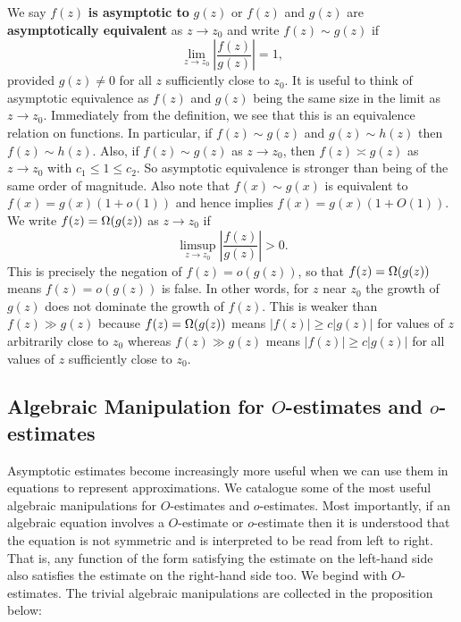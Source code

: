        We say $f(z)$ \textbf{is asymptotic to} $g(z)$ or $f(z)$ and $g(z)$ are \textbf{asymptotically equivalent} as $z \to z_{0}$ and write $f(z) \sim g(z)$ if
        \[
          \lim_{z \to z_{0}}\left|\frac{f(z)}{g(z)}\right| = 1,
        \]
        provided $g(z) \neq 0$ for all $z$ sufficiently close to $z_{0}$. It is useful to think of asymptotic equivalence as $f(z)$ and $g(z)$ being the same size in the limit as $z \to z_{0}$. Immediately from the definition, we see that this is an equivalence relation on functions. In particular, if $f(z) \sim g(z)$ and $g(z) \sim h(z)$ then $f(z) \sim h(z)$. Also, if $f(z) \sim g(z)$ as $z \to z_{0}$, then $f(z) \asymp g(z)$ as $z \to z_{0}$ with $c_{1} \le 1 \le c_{2}$. So asymptotic equivalence is stronger than being of the same order of magnitude. Also note that $f(x) \sim g(x)$ is equivalent to $f(x) = g(x)(1+o(1))$ and hence implies $f(x) = g(x)(1+O(1))$. We write $f(z) = \Omega(g(z))$ as $z \to z_{0}$ if
        \[
          \limsup_{z \to z_{0}}\left|\frac{f(z)}{g(z)}\right| > 0.
        \]
        This is precisely the negation of $f(z) = o(g(z))$, so that $f(z) = \Omega(g(z))$ means $f(z) = o(g(z))$ is false. In other words, for $z$ near $z_{0}$ the growth of $g(z)$ does not dominate the growth of $f(z)$. This is weaker than $f(z) \gg g(z)$ because $f(z) = \Omega(g(z))$ means $|f(z)| \ge c|g(z)|$ for values of $z$ arbitrarily close to $z_{0}$ whereas $f(z) \gg g(z)$ means $|f(z)| \ge c|g(z)|$ for all values of $z$ sufficiently close to $z_{0}$.
      \subsection*{Algebraic Manipulation for \texorpdfstring{$O$}{O}-estimates and \texorpdfstring{$o$}{o}-estimates}
        Asymptotic estimates become increasingly more useful when we can use them in equations to represent approximations. We catalogue some of the most useful algebraic manipulations for $O$-estimates and $o$-estimates. Most importantly, if an algebraic equation involves a $O$-estimate or $o$-estimate then it is understood that the equation is not symmetric and is interpreted to be read from left to right. That is, any function of the form satisfying the estimate on the left-hand side also satisfies the estimate on the right-hand side too. We begind with $O$-estimates. The trivial algebraic manipulations are collected in the proposition below:

